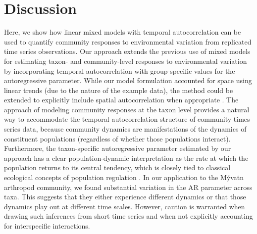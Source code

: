 
\section*{Discussion}

Here, we show how linear mixed models with temporal autocorrelation can be used to quantify
community responses to environmental variation from replicated time series observations. 
Our approach extends the previous use of mixed models for estimating taxon- and community-level
responses to environmental variation \citep{Bartrons2015, Jackson2012} by
incorporating temporal autocorrelation with group-specific values for the autoregressive parameter. 
While our model formulation accounted for space using linear trends (due to the nature of the example data),
the method could be extended to explicitly include spatial autocorrelation when appropriate
\citep[similar to][]{Bartrons2015}.
The approach of modeling community responses at the taxon level
provides a natural way to accommodate the temporal autocorrelation
structure of community times series data,
because community dynamics are manifestations of the dynamics of constituent populations 
(regardless of whether those populations interact).
Furthermore, the taxon-specific autoregressive parameter
estimated by our approach has a clear population-dynamic interpretation as the rate at which the
population returns to its central tendency, which is closely tied to classical ecological
concepts of population regulation \citep{Nicholson1933, Ziebarth2010}. 
In our application to the M\'{y}vatn arthropod community,
we found substantial variation in the AR parameter across taxa.
This suggests that they either experience different dynamics or that those dynamics play out at different time scales.
However, caution is warranted when drawing such inferences from short time series
and when not explicitly accounting for interspecific interactions.



